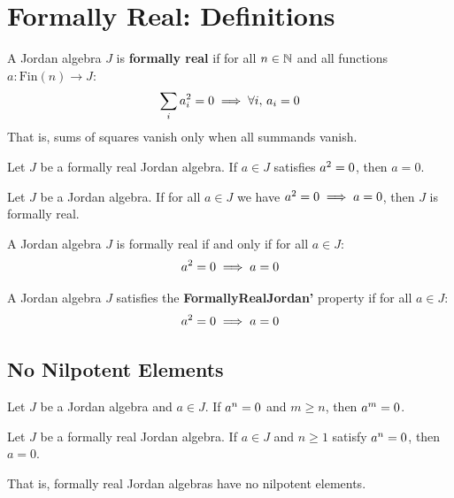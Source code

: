 \section{Formally Real: Definitions}

\begin{definition}[FormallyRealJordan]
A Jordan algebra $J$ is \textbf{formally real} if for all $n \in \mathbb{N}$ and all functions $a : \mathrm{Fin}(n) \to J$:
\[
\sum_{i} a_i^{2} = 0 \implies \forall i,\, a_i = 0
\]
That is, sums of squares vanish only when all summands vanish.
\end{definition}

\begin{theorem}
Let $J$ be a formally real Jordan algebra. If $a \in J$ satisfies $a^{2} = 0$, then $a = 0$.
\end{theorem}

\begin{theorem}[of\_sq\_eq\_zero]
Let $J$ be a Jordan algebra. If for all $a \in J$ we have $a^{2} = 0 \implies a = 0$, then $J$ is formally real.
\end{theorem}

\begin{theorem}
A Jordan algebra $J$ is formally real if and only if for all $a \in J$:
\[
a^{2} = 0 \implies a = 0
\]
\end{theorem}

\begin{definition}[FormallyRealJordan']
A Jordan algebra $J$ satisfies the \textbf{FormallyRealJordan'} property if for all $a \in J$:
\[
a^{2} = 0 \implies a = 0
\]
\end{definition}

\subsection{No Nilpotent Elements}

\begin{theorem}
Let $J$ be a Jordan algebra and $a \in J$. If $a^{n} = 0$ and $m \ge n$, then $a^{m} = 0$.
\end{theorem}

\begin{theorem}
Let $J$ be a formally real Jordan algebra. If $a \in J$ and $n \ge 1$ satisfy $a^{n} = 0$, then $a = 0$.

That is, formally real Jordan algebras have no nilpotent elements.
\end{theorem}
